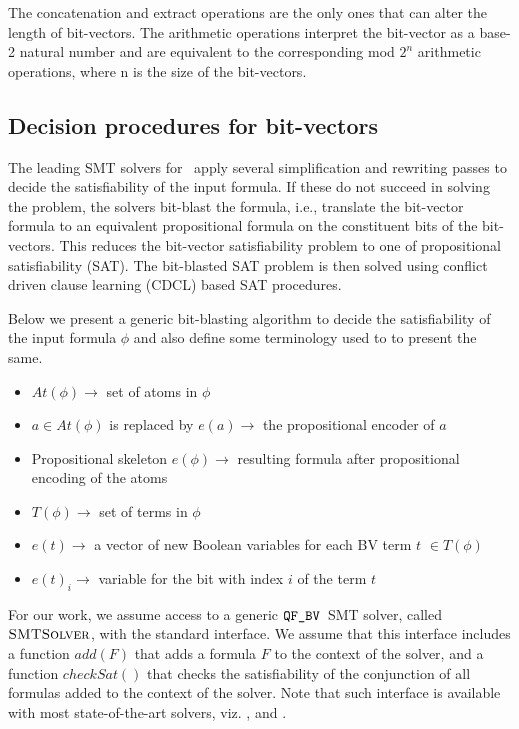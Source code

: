 The
concatenation and extract operations are the only ones that can alter the
length of bit-vectors. The arithmetic operations interpret the bit-vector as a base-2 natural number and are
equivalent to the corresponding mod $2^n$ arithmetic operations, where n is the size of the bit-vectors.

\subsection{Decision procedures for bit-vectors}

The leading SMT solvers for \qfbv~apply several simplification and
rewriting passes to decide the satisfiability of the input formula.
If these do not succeed in solving the problem, the solvers bit-blast
the formula, i.e., translate the bit-vector formula to an
equivalent propositional formula on the constituent bits of the
bit-vectors.  This reduces the bit-vector satisfiability problem to
one of propositional satisfiability (SAT).
%
The bit-blasted SAT problem is then solved using conflict driven clause
learning (CDCL)\cite{cdcl1,cdcl2} based SAT procedures.
%

Below we present a generic bit-blasting algorithm to decide the satisfiability of the input formula $\phi$ and also define some terminology used to to present the same.

\begin{itemize}

\item $At(\phi)\rightarrow$ set of atoms in $\phi$ 
\item $a \in At(\phi)$ is replaced by $e(a) \rightarrow$ the propositional encoder of $a$ 
\item Propositional skeleton $e(\phi) \rightarrow$ resulting formula after propositional encoding of the atoms 
\item $T(\phi)\rightarrow$ set of terms in $\phi$ 
\item $e(t)\rightarrow$ a vector of new Boolean variables for each BV term $t$ $\in T(\phi)$ 
\item $e(t)_i\rightarrow$ variable for the bit with index $i$ of the term $t$ 
\end{itemize}



For our work, we assume access to a generic $\texttt{QF\_BV}$~SMT solver, called
$\textsc{SMTSolver}$, with the standard interface.
%
We assume that this interface includes a function $add(F)$ that adds a
formula $F$ to the context of the solver, and a function $checkSat()$
that checks the satisfiability of the conjunction of all formulas
added to the context of the solver.  Note that such interface is
available with most state-of-the-art solvers, viz. {\boolector},
{\cvcfour} and {\zthree}.


